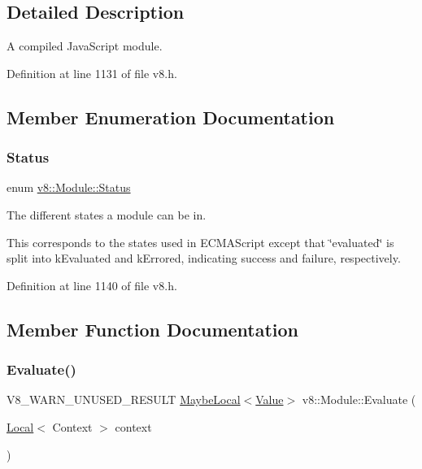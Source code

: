 \subsection{Detailed Description}
A compiled Java\+Script module. 

Definition at line 1131 of file v8.\+h.



\subsection{Member Enumeration Documentation}
\mbox{\label{classv8_1_1Module_a9c2a22c9cb8e928d570c38648c648b7e}} 
\subsubsection{\texorpdfstring{Status}{Status}}
{\footnotesize\ttfamily enum \mbox{\hyperlink{classv8_1_1Module_a9c2a22c9cb8e928d570c38648c648b7e}{v8\+::\+Module\+::\+Status}}}

The different states a module can be in.

This corresponds to the states used in E\+C\+M\+A\+Script except that \char`\"{}evaluated\char`\"{} is split into k\+Evaluated and k\+Errored, indicating success and failure, respectively. 

Definition at line 1140 of file v8.\+h.



\subsection{Member Function Documentation}
\mbox{\label{classv8_1_1Module_a0785fa83cd3dde1dee086e1f9d31abdc}} 
\subsubsection{\texorpdfstring{Evaluate()}{Evaluate()}}
{\footnotesize\ttfamily V8\+\_\+\+W\+A\+R\+N\+\_\+\+U\+N\+U\+S\+E\+D\+\_\+\+R\+E\+S\+U\+LT \mbox{\hyperlink{classv8_1_1MaybeLocal}{Maybe\+Local}}$<$\mbox{\hyperlink{classv8_1_1Value}{Value}}$>$ v8\+::\+Module\+::\+Evaluate (\begin{DoxyParamCaption}\item[{\mbox{\hyperlink{classv8_1_1Local}{Local}}$<$ Context $>$}]{context }\end{DoxyParamCaption})}

